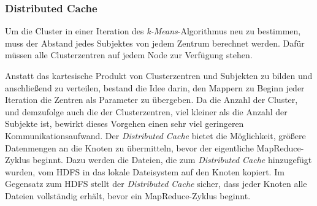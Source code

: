 \documentclass[a4paper]{llncs}
\begin{document}

\subsubsection{Distributed Cache}

Um die Cluster in einer Iteration des \emph{k-Means}-Algorithmus neu zu bestimmen, muss der Abstand jedes Subjektes von jedem Zentrum berechnet werden. Dafür müssen alle Clusterzentren auf jedem Node zur Verfügung stehen.

Anstatt das kartesische Produkt von Clusterzentren und Subjekten zu bilden und anschließend zu verteilen, bestand die Idee darin, den Mappern zu Beginn jeder Iteration die Zentren als Parameter zu übergeben. Da die Anzahl der Cluster, und demzufolge auch die der Clusterzentren, viel kleiner als die Anzahl der Subjekte ist, bewirkt dieses Vorgehen einen sehr viel geringeren Kommunikationsaufwand.
Der \emph{Distributed Cache} bietet die Möglichkeit, größere Datenmengen an die Knoten zu übermitteln, bevor der eigentliche MapReduce-Zyklus beginnt. Dazu werden die Dateien, die zum \emph{Distributed Cache} hinzugefügt wurden, vom HDFS in das lokale Dateisystem auf den Knoten kopiert. Im Gegensatz zum HDFS stellt der \emph{Distributed Cache} sicher, dass jeder Knoten alle Dateien vollständig erhält, bevor ein MapReduce-Zyklus beginnt.

\end{document}
